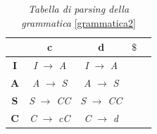 \begin{table}
	\centering
	\label{tabellaparsing}
	\begin{tabular}{ccccc} %
		\toprule
		& \textbf{c} & \textbf{d} & \textbf{$\$$} \\ 
		\midrule
		\textbf{I}			& \textit{I} $\to$ \textit{A}  & \textit{I} $\to$ \textit{A} &    \\ 
		\textbf{A} 			& \textit{A} $\to$ \textit{S}  & \textit{A} $\to$ \textit{S} &    \\ 
		\textbf{S}			& \textit{S} $\to$ \textit{CC} & \textit{S} $\to$ \textit{CC} &   \\ 
		\textbf{C} 			& \textit{C} $\to$ \textit{cC}& \textit{C} $\to$ \textit{d} &     \\ 
		\bottomrule
	\end{tabular}
	\caption{\textit{Tabella di parsing della grammatica }\ref{grammatica2}}
\end{table} 
\vspace{1.5cm}
